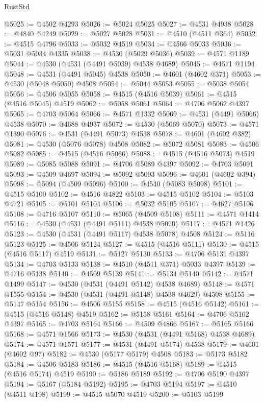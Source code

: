 \begin{lexlean}{RustStd}
\begin{coremodule}
@5025 := @4502 @4293
@5026 := @5024 @5025
@5027 := @4531 @4938
@5028 := @4840 @4249
@5029 := @5027 @5028
@5031 := @4510 (@4511 @364)
@5032 := @4515 @4796
@5033 := @5032 @4519
@5034 := @4566 @5033
@5036 := @5031 @5034 @4335
@5038 := @4530 (@5029 @5036)
@5039 := @4571 @1189
@5044 := @4530 (@4531 (@4491 @5039) @4538 @4689)
@5045 := @4571 @1194
@5048 := @4531 (@4491 @5045) @4538
@5050 := @4601 (@4602 @371)
@5053 := @4530 (@5048 @5050) @4508
@5054 := @5044 @5053
@5055 := @5038 @5054
@5056 := @4506 @5055
@5058 := @4515 (@4516 @5039)
@5061 := @4515 (@4516 @5045) @4519
@5062 := @5058 @5061
@5064 := @4706 @5062 @4397
@5065 := @4703 @5064
@5066 := @4571 @1332
@5069 := @4531 (@4491 @5066) @4538
@5070 := @4688 @4937
@5072 := @4530 (@5069 @5070)
@5073 := @4571 @1390
@5076 := @4531 (@4491 @5073) @4538
@5078 := @4601 (@4602 @382)
@5081 := @4530 (@5076 @5078) @4508
@5082 := @5072 @5081
@5083 := @4506 @5082
@5085 := @4515 (@4516 @5066)
@5088 := @4515 (@4516 @5073) @4519
@5089 := @5085 @5088
@5091 := @4706 @5089 @4397
@5092 := @4703 @5091
@5093 := @4509 @4697
@5094 := @5092 @5093
@5096 := @4601 (@4602 @394)
@5098 := @5094 (@4509 @5096)
@5100 := @4540 (@5083 @5098)
@5101 := @4515 @5100
@5102 := @4516 @4822
@5103 := @4515 @5102
@5104 := @5103 @4721
@5105 := @5101 @5104
@5106 := @5032 @5105
@5107 := @4627 @5106
@5108 := @4716 @5107
@5110 := @5065 (@4509 @5108)
@5111 := @4571 @1414
@5116 := @4530 (@4531 (@4491 @5111) @4538 @5070)
@5117 := @4571 @1426
@5123 := @4530 (@4531 (@4491 @5117) @4538 @5078) @4508
@5124 := @5116 @5123
@5125 := @4506 @5124
@5127 := @4515 (@4516 @5111)
@5130 := @4515 (@4516 @5117) @4519
@5131 := @5127 @5130
@5133 := @4706 @5131 @4397
@5134 := @4703 @5133
@5138 := @4510 (@4511 @371) @5033 @4397
@5139 := @4716 @5138
@5140 := @4509 @5139
@5141 := @5134 @5140
@5142 := @4571 @1499
@5147 := @4530 (@4531 (@4491 @5142) @4538 @4689)
@5148 := @4571 @1555
@5154 := @4530 (@4531 (@4491 @5148) @4538 @4629) @4508
@5155 := @5147 @5154
@5156 := @4506 @5155
@5158 := @4515 (@4516 @5142)
@5161 := @4515 (@4516 @5148) @4519
@5162 := @5158 @5161
@5164 := @4706 @5162 @4397
@5165 := @4703 @5164
@5166 := @4509 @4866
@5167 := @5165 @5166
@5168 := @4571 @1566
@5173 := @4530 (@4531 (@4491 @5168) @4538 @4689)
@5174 := @4571 @1571
@5177 := @4531 (@4491 @5174) @4538
@5179 := @4601 (@4602 @97)
@5182 := @4530 (@5177 @5179) @4508
@5183 := @5173 @5182
@5184 := @4506 @5183
@5186 := @4515 (@4516 @5168)
@5189 := @4515 (@4516 @5174) @4519
@5190 := @5186 @5189
@5192 := @4706 @5190 @4397
@5194 := @5167 (@5184 @5192)
@5195 := @4703 @5194
@5197 := @4510 (@4511 @198)
@5199 := @4515 @5070 @4519
@5200 := @5103 @5199

\end{coremodule}
\end{lexlean}
